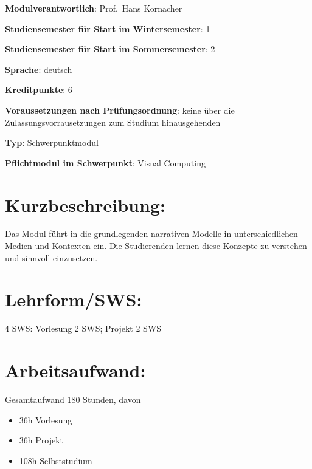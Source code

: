 \begin{modulHead}
\textbf{Modulverantwortlich}: Prof.~Hans
Kornacher
\end{modulHead}
\begin{modulHead}
\textbf{Studiensemester für
Start im Wintersemester}:
1
\end{modulHead}
\begin{modulHead}
\textbf{Studiensemester für Start
im Sommersemester}:
2
\end{modulHead}
\begin{modulHead}
\textbf{Sprache}:
deutsch
\end{modulHead}
\begin{modulHead}
\textbf{Kreditpunkte}:
6
\end{modulHead}
\begin{modulHead}
\textbf{Voraussetzungen nach
Prüfungsordnung}: keine über die Zulassungsvorrausetzungen zum Studium
hinausgehenden
\end{modulHead}
\begin{modulHead}
\textbf{Typ}:
Schwerpunktmodul
\end{modulHead}
\begin{modulHead}
\textbf{Pflichtmodul
im Schwerpunkt}: Visual Computing
\end{modulHead}


\section*{Kurzbeschreibung:}\label{kurzbeschreibung-9}

Das Modul führt in die grundlegenden narrativen Modelle in
unterschiedlichen Medien und Kontexten ein. Die Studierenden lernen
diese Konzepte zu verstehen und sinnvoll einzusetzen.

\section*{Lehrform/SWS:}\label{lehrformsws-17}

4 SWS: Vorlesung 2 SWS; Projekt 2 SWS

\section*{Arbeitsaufwand:}\label{arbeitsaufwand-18}

Gesamtaufwand 180 Stunden, davon

\begin{itemize}
\tightlist
\item
  36h Vorlesung
\item
  36h Projekt
\item
  108h Selbststudium
\end{itemize}

